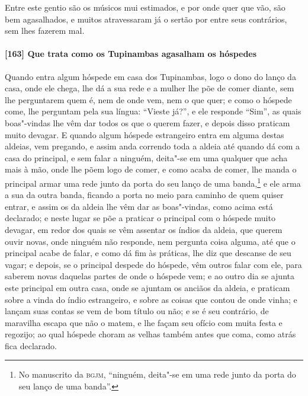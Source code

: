 Entre este gentio são os músicos mui estimados, e por onde quer que vão, são bem
agasalhados, e muitos atravessaram já o sertão por entre seus contrários, sem lhes fazerem
mal.

\paragraph{[163] Que trata como os Tupinambas agasalham os hóspedes}\quad
Quando entra algum hóspede em casa dos Tupinambas, logo o dono do lanço da casa, onde ele
chega, lhe dá a sua rede e a mulher lhe põe de comer diante, sem lhe perguntarem quem é,
nem de onde vem, nem o que quer; e como o hóspede come, lhe perguntam pela sua língua:
``Vieste já?'', e ele responde ``Sim'', as quais boas"-vindas lhe vêm dar todos os que o
querem fazer, e depois disso praticam muito devagar. E quando algum hóspede estrangeiro
entra em alguma destas aldeias, vem pregando, e assim anda correndo toda a aldeia até
quando dá com a casa do principal, e sem falar a ninguém, deita"-se em uma qualquer que
acha mais à mão, onde lhe põem logo de comer, e como acaba de comer, lhe manda o principal
armar uma rede junto da porta do seu lanço de uma banda,\footnote{ No manuscrito da
\textsc{bgjm}, ``ninguém, deita"-se em uma rede junto da porta do seu lanço de uma
banda''.} e ele arma a sua da outra banda, ficando a porta no meio para caminho de quem
quiser entrar, e assim os da aldeia lhe vêm dar as boas"-vindas, como acima está declarado;
e neste lugar se põe a praticar o principal com o hóspede muito devagar, em redor dos
quais se vêm assentar os índios da aldeia, que querem ouvir novas, onde ninguém não
responde, nem pergunta coisa alguma, até que o principal acabe de falar, e como dá fim às
práticas, lhe diz que descanse de seu vagar; e depois, se o principal despede do hóspede,
vêm outros falar com ele, para saberem novas daquelas partes de onde o hóspede vem; e ao
outro dia se ajunta este principal em outra casa, onde se ajuntam os anciãos da aldeia, e
praticam sobre a vinda do índio estrangeiro, e sobre as coisas que contou de onde vinha; e
lançam suas contas se vem de bom título ou não; e se é seu contrário, de maravilha escapa
que não o matem, e lhe façam seu ofício com muita festa e regozijo; ao qual hóspede choram
as velhas também antes que coma, como atrás fica declarado.

